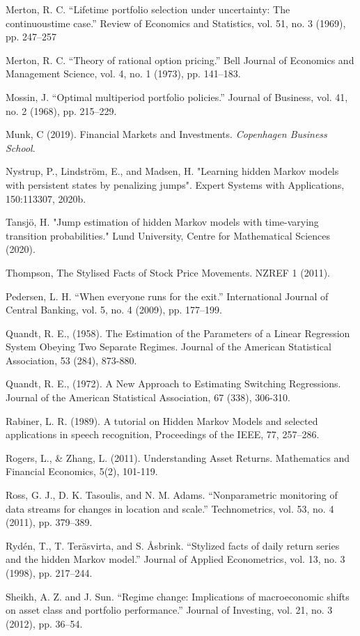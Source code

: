 Merton, R. C. “Lifetime portfolio selection under uncertainty: The continuoustime case.” Review of Economics and Statistics, vol. 51, no. 3 (1969), pp. 247–257

Merton, R. C. “Theory of rational option pricing.” Bell Journal of Economics and Management Science, vol. 4, no. 1 (1973), pp. 141–183.

Mossin, J. “Optimal multiperiod portfolio policies.” Journal of Business, vol. 41,
no. 2 (1968), pp. 215–229.

Munk, C (2019). Financial Markets and Investments. \textit{Copenhagen Business School}.

Nystrup, P., Lindström, E., and Madsen, H. "Learning hidden Markov models with persistent states by penalizing jumps". Expert Systems with Applications, 150:113307, 2020b.

Tansjö, H. "Jump estimation of hidden Markov models with time-varying transition probabilities." Lund University, Centre for Mathematical Sciences (2020).

Thompson, The Stylised Facts of Stock Price Movements. NZREF 1 (2011).

Pedersen, L. H. “When everyone runs for the exit.” International Journal of Central Banking, vol. 5, no. 4 (2009), pp. 177–199.

Quandt, R. E., (1958). The Estimation of the Parameters of a Linear Regression System Obeying Two Separate Regimes. Journal of the American Statistical Association, 53 (284), 873-880.

Quandt, R. E., (1972). A New Approach to Estimating Switching Regressions. Journal of the American
Statistical Association, 67 (338), 306-310.

Rabiner, L. R. (1989). A tutorial on Hidden Markov Models and selected applications in speech recognition, Proceedings of the IEEE, 77, 257–286.

Rogers, L., \& Zhang, L. (2011). Understanding Asset Returns. Mathematics and Financial Economics,
5(2), 101-119.

Ross, G. J., D. K. Tasoulis, and N. M. Adams. “Nonparametric monitoring of data streams for changes in location and scale.” Technometrics, vol. 53, no. 4 (2011), pp. 379–389.

Rydén, T., T. Teräsvirta, and S. Åsbrink. “Stylized facts of daily return series and the hidden Markov model.” Journal of Applied Econometrics, vol. 13, no. 3 (1998), pp. 217–244.

Sheikh, A. Z. and J. Sun. “Regime change: Implications of macroeconomic shifts on asset class and portfolio performance.” Journal of Investing, vol. 21, no. 3 (2012), pp. 36–54.

